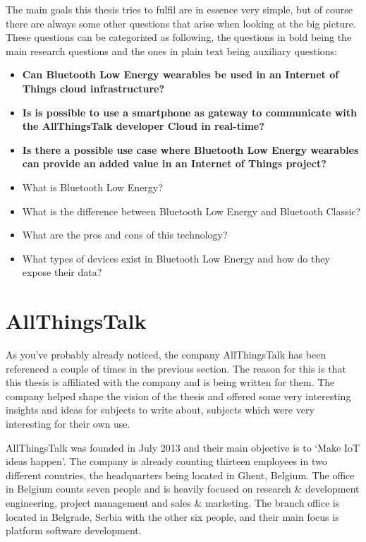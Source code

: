 \documentclass[pdftex,a4paper,12pt,twoside]{report}
\begin{document}
The main goals this thesis tries to fulfil are in essence very simple, but of course there are always some other questions that arise when looking at the big picture. These questions can be categorized as following, the questions in bold being the main research questions and the ones in plain text being auxiliary questions:
\begin{itemize}
	\item{\textbf{Can Bluetooth Low Energy wearables be used in an Internet of Things cloud infrastructure?}}
	\item{\textbf{Is is possible to use a smartphone as gateway to communicate with the AllThingsTalk developer Cloud in real-time?}}
	\item{\textbf{Is there a possible use case where Bluetooth Low Energy wearables can provide an added value in an Internet of Things project?}}
	\item{What is Bluetooth Low Energy?}
	\item{What is the difference between Bluetooth Low Energy and Bluetooth Classic?}
	\item{What are the pros and cons of this technology?}
	\item{What types of devices exist in Bluetooth Low Energy and how do they expose their data?}
\end{itemize}

\section{AllThingsTalk}
\label{sec:allthingstalk}
As you've probably already noticed, the company AllThingsTalk has been referenced a couple of times in the previous section. The reason for this is that this thesis is affiliated with the company and is being written for them. The company helped shape the vision of the thesis and offered some very interesting insights and ideas for subjects to write about, subjects which were very interesting for their own use.

AllThingsTalk was founded in July 2013 and their main objective is to `Make IoT ideas happen'. The company is already counting thirteen employees in two different countries, the headquarters being located in Ghent, Belgium. The office in Belgium counts seven people and is heavily focused on research \& development engineering, project management and sales \& marketing. The branch office is located in Belgrade, Serbia with the other six people, and their main focus is platform software development.
\end{document}
